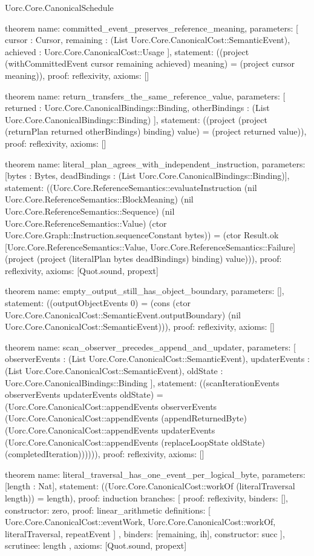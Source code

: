 \begin{lexlean}{Uorc.Core.CanonicalSchedule}
\begin{semanticmodule}
theorem{
  name: committed_event_preserves_reference_meaning,
  parameters: [
    cursor : Cursor,
    remaining : (List Uorc.Core.CanonicalCost::SemanticEvent),
    achieved : Uorc.Core.CanonicalCost::Usage
  ],
  statement: ((project (withCommittedEvent cursor remaining achieved) meaning) = (project cursor meaning)),
  proof: reflexivity{},
  axioms: []
}

theorem{
  name: return_transfers_the_same_reference_value,
  parameters: [
    returned : Uorc.Core.CanonicalBindings::Binding,
    otherBindings : (List Uorc.Core.CanonicalBindings::Binding)
  ],
  statement: ((project (project (returnPlan returned otherBindings) binding) value) = (project returned value)),
  proof: reflexivity{},
  axioms: []
}

theorem{
  name: literal_plan_agrees_with_independent_instruction,
  parameters: [bytes : Bytes, deadBindings : (List Uorc.Core.CanonicalBindings::Binding)],
  statement: ((Uorc.Core.ReferenceSemantics::evaluateInstruction (nil Uorc.Core.ReferenceSemantics::BlockMeaning) (nil Uorc.Core.ReferenceSemantics::Sequence) (nil Uorc.Core.ReferenceSemantics::Value) (ctor Uorc.Core.Graph::Instruction.sequenceConstant bytes)) = (ctor Result.ok [Uorc.Core.ReferenceSemantics::Value, Uorc.Core.ReferenceSemantics::Failure] (project (project (literalPlan bytes deadBindings) binding) value))),
  proof: reflexivity{},
  axioms: [Quot.sound, propext]
}

theorem{
  name: empty_output_still_has_object_boundary,
  parameters: [],
  statement: ((outputObjectEvents 0) = (cons (ctor Uorc.Core.CanonicalCost::SemanticEvent.outputBoundary) (nil Uorc.Core.CanonicalCost::SemanticEvent))),
  proof: reflexivity{},
  axioms: []
}

theorem{
  name: scan_observer_precedes_append_and_updater,
  parameters: [
    observerEvents : (List Uorc.Core.CanonicalCost::SemanticEvent),
    updaterEvents : (List Uorc.Core.CanonicalCost::SemanticEvent),
    oldState : Uorc.Core.CanonicalBindings::Binding
  ],
  statement: ((scanIterationEvents observerEvents updaterEvents oldState) = (Uorc.Core.CanonicalCost::appendEvents observerEvents (Uorc.Core.CanonicalCost::appendEvents (appendReturnedByte) (Uorc.Core.CanonicalCost::appendEvents updaterEvents (Uorc.Core.CanonicalCost::appendEvents (replaceLoopState oldState) (completedIteration)))))),
  proof: reflexivity{},
  axioms: []
}

theorem{
  name: literal_traversal_has_one_event_per_logical_byte,
  parameters: [length : Nat],
  statement: ((Uorc.Core.CanonicalCost::workOf (literalTraversal length)) = length),
  proof: induction{
    branches: [
      {proof: reflexivity{}, binders: [], constructor: zero},
      {
        proof: linear_arithmetic{
          definitions: [
            Uorc.Core.CanonicalCost::eventWork,
            Uorc.Core.CanonicalCost::workOf,
            literalTraversal,
            repeatEvent
          ]
        },
        binders: [remaining, ih],
        constructor: succ
      }
    ],
    scrutinee: length
  },
  axioms: [Quot.sound, propext]
}


\end{semanticmodule}
\end{lexlean}
